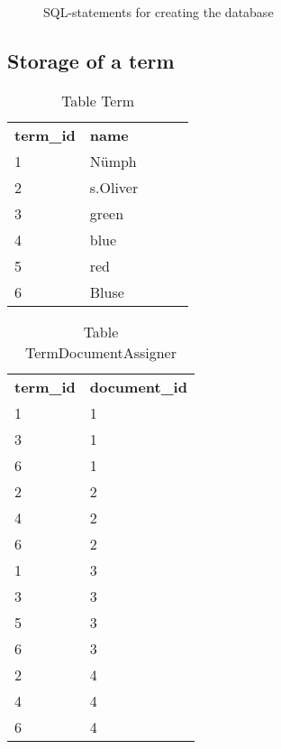 \begin{figure}[h]
    
    \caption{SQL-statements for creating the database}
\end{figure}

\subsection{Storage of a term}

\begin{table}[h]
    \begin{center}
        \begin{tabular}{ l l l l l }
            \rowcolor{Gray}
            \textbf{term\_id}   & \textbf{name}\\
            1                   & N\"umph\\
            2                   & s.Oliver\\
            3                   & green\\
            4                   & blue\\
            5                   & red\\
            6                   & Bluse\\
        \end{tabular}
        \caption{Table Term}
    \end{center}
\end{table}

\begin{table}[h]
    \begin{center}
        \begin{tabular}{ l l }
            \rowcolor{Gray}
            \textbf{term\_id}   & \textbf{document\_id}\\
            1                   & 1\\
            3                   & 1\\
            6                   & 1\\
            2                   & 2\\
            4                   & 2\\
            6                   & 2\\
            1                   & 3\\
            3                   & 3\\
            5                   & 3\\
            6                   & 3\\
            2                   & 4\\
            4                   & 4\\
            6                   & 4\\
        \end{tabular}
        \caption{Table TermDocumentAssigner}
    \end{center}
\end{table}



